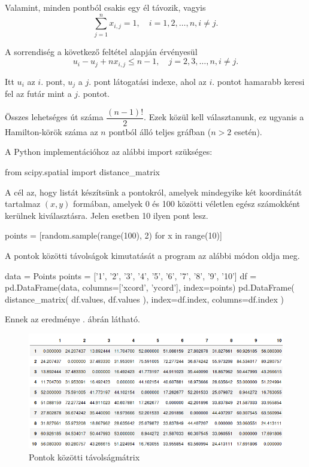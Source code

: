 Valamint, minden pontból csakis egy él távozik, vagyis
\[
\displaystyle
\sum_{j=1}^n x_{i,j} = 1, \quad i = 1, 2, \ldots, n, i \neq j.
\]

A sorrendiség a következő feltétel alapján érvényesül
\[
u_i - u_j + n x_{i,j} \leq n - 1, \quad j = 2, 3, \ldots, n, i \neq j.
\]

Itt $u_{i}$ az $i.$ pont, $u_{j}$ a $j.$ pont látogatási indexe, ahol az $i.$ pontot hamarabb keresi fel az futár mint a $j.$ pontot.


Összes lehetséges út száma
\(
\dfrac{(n-1)!}{2}.
\)
Ezek közül kell választanunk, ez ugyanis a Ha\-mil\-ton-körök száma az $n$ pontból álló teljes gráfban ($n > 2$ esetén).

A Python implementációhoz az alábbi import szükséges:\cite{Python} \cite{Spatial}
\begin{python}
from scipy.spatial import distance_matrix
\end{python}
A cél az, hogy listát készítsünk a pontokról, amelyek mindegyike két koordinátát tartalmaz $(x, y)$ formában, amelyek 0 és 100 közötti véletlen egész számokként kerülnek kiválasztásra. Jelen esetben 10 ilyen pont lesz.
\begin{python}
points = [random.sample(range(100), 2) for x in range(10)]
\end{python}
A pontok közötti távolságok kimutatását a program az alábbi módon oldja meg.
\begin{python}
data = Points
points = ['1', '2', '3', '4', '5', '6', '7', '8', '9', '10']
df = pd.DataFrame(data, columns=['xcord', 'ycord'], index=points)
pd.DataFrame(
	distance_matrix(
		df.values, 
		df.values
	), 
	index=df.index,
	columns=df.index
)
\end{python}

Ennek az eredménye . ábrán látható.

\begin{figure}[h!]
\centering
\includegraphics[width=\textwidth]{images/table.png}
\caption{Pontok közötti távolságmátrix}
\label{fig:kimenet}
\end{figure}

